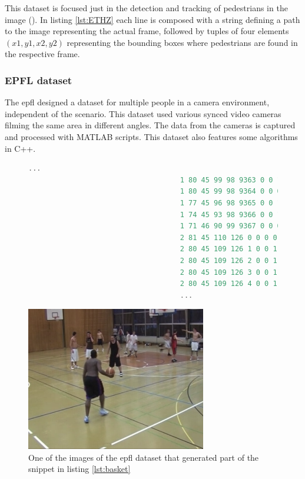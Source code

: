 This dataset is focused just in the detection and tracking of pedestrians in the image (\cite{ETHZEidgenossischeTechnischeHochschuleZurich}). In listing \ref{lst:ETHZ} each line is composed with a string defining a path to the image representing the actual frame, followed by tuples of four elements $(x1,y1,x2,y2)$ representing the bounding boxes where pedestrians are found in the respective frame. 

\subsubsection{EPFL dataset}
The \gls{epfl} designed a dataset for multiple people in a camera environment, independent of the scenario. This dataset used various synced video cameras filming the same area in different angles. The data from the cameras is captured and processed with MATLAB scripts. This dataset also features some algorithms in C++.

\begin{figure}
\begin{center}
	\begin{lstlisting}[label={lst:basket}, caption={ETHZ dataset file snippet.},language=c++]
									...
									1 80 45 99 98 9363 0 0 1 "PERSON"
									1 80 45 99 98 9364 0 0 0 "PERSON"
									1 77 45 96 98 9365 0 0 1 "PERSON"
									1 74 45 93 98 9366 0 0 1 "PERSON"
									1 71 46 90 99 9367 0 0 0 "PERSON"
									2 81 45 110 126 0 0 0 0 "PERSON"
									2 80 45 109 126 1 0 0 1 "PERSON"
									2 80 45 109 126 2 0 0 1 "PERSON"
									2 80 45 109 126 3 0 0 1 "PERSON"
									2 80 45 109 126 4 0 0 1 "PERSON"
									...	\end{lstlisting}
\end{center}
\end{figure}

\begin{figure}[htp]
	
	\centering
	\includegraphics[width=0.7\textwidth]{capstate/imgs/basket.png}
	
	\caption{One of the images of the \gls{epfl} dataset that generated part of the snippet in listing \ref{lst:basket} }
	\label{fig:basketimg}
	
\end{figure}


